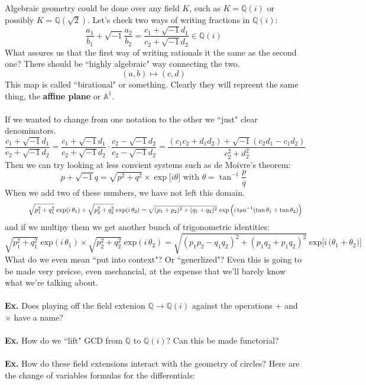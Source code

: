 \documentclass[12pt]{article}
\begin{document}
\noindent Algebraic geometry could be done over any field $K$, such as $K = \mathbb{Q}(i)$ or possibly $K = \mathbb{Q}(\sqrt{2})$.  Let's check two ways of writing fractions in $\mathbb{Q}(i)$:
$$ \frac{a_1}{b_1} + \sqrt{-1} \frac{a_2}{b_2} = \frac{c_1 + \sqrt{-1}d_1}{c_2 + \sqrt{-1}d_2} \in \mathbb{Q}(i) $$
What assures us that the first way of writing rationals it the same as the second one?  There should be ``highly algebraic" way connecting the two.
$$ (a,b) \mapsto (c,d) $$
This map is called ``birational" or something.  Clearly they will repreent the same thing, the \textbf{affine plane} or $\mathbb{A}^1$. \\ \\
If we wanted to change from one notation to the other we ``just" clear denominators.
$$ \frac{c_1 + \sqrt{-1}d_1}{c_2 + \sqrt{-1}d_2} = 
\frac{c_1 + \sqrt{-1}d_1}{c_2 + \sqrt{-1}d_2} \cdot \frac{c_2 - \sqrt{-1}d_2}{c_2 - \sqrt{-1}d_2} 
= \frac{(c_1 c_2 + d_1 d_2) + \sqrt{-1}(c_2 d_1 - c_1 d_2)}{c_2^2 + d_2^2 }$$
Then we can try looking at less convient systems such as de Moivre's theorem:
$$  p + \sqrt{-1}q  = \sqrt{p^2 + q^2} \times  \exp \big[i \theta \big] \text{ with } \theta = \tan^{-1} \frac{p}{q}  $$
When we add two of these numbers, we have not left this domain.
$$ \hspace{0.5in}
\sqrt{p_1^2 + q_1^2} \; \text{exp} (i\,\theta_1) +
\sqrt{p_2^2 + q_2^2} \; \text{exp} (i\,\theta_2) =
\sqrt{(p_1+p_2)^2 + (q_1+q_2)^2} \, \exp \Big (i \tan^{-1} (\tan \theta_1 + \tan \theta_2) \Big)
 $$
 and if we multipy them we get another bunch of trigonometric identities:
 $$ \sqrt{p_1^2 + q_1^2} \; \text{exp} (i\,\theta_1) \times
\sqrt{p_2^2 + q_2^2} \; \text{exp} (i\,\theta_2) 
= \sqrt{(p_1p_2 -q_1q_2)^2 + (p_1q_2 + p_1q_2)^2} \; \text{exp} \big[i\,\big( \theta_1 + \theta_2)\big] $$
What do we even mean ``put into context"?  Or ``generlized"?  Even this is going to be made very preicse, even mechancial, at the expense that we'll barely know what we're talking about. \\ \\
\textbf{Ex.} Does playing off the field extenion $\mathbb{Q} \to \mathbb{Q}(i)$ against the operations $+$ and $\times$ have a name? \\ \\
\textbf{Ex.} How do we ``lift" GCD from $\mathbb{Q}$ to $\mathbb{Q}(i)$?  Can this be made functorial? \\ \\
\textbf{Ex.} How do these field extensions interact with the geometry of circles?  Here are the change of variables formulas for the differentials:
\end{document}
